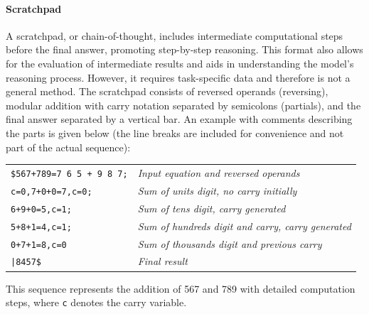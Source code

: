 \paragraph{Scratchpad}\label{par:scratchpad}
A scratchpad, or chain-of-thought, includes intermediate computational steps before the final answer, promoting step-by-step reasoning. This format also allows for the evaluation of intermediate results and aids in understanding the model's reasoning process. However, it requires task-specific data and therefore is not a general method. The scratchpad consists of reversed operands (reversing), modular addition with carry notation separated by semicolons (partials), and the final answer separated by a vertical bar. An example with comments describing the parts is given below (the line breaks are included for convenience and not part of the actual sequence):
\begin{center}
    \begin{tabular}{l l}
        \verb|$567+789=7 6 5 + 9 8 7;| & \textit{Input equation and reversed operands}             \\
        \verb|c=0,7+0+0=7,c=0;|        & \textit{Sum of units digit, no carry initially}           \\
        \verb|6+9+0=5,c=1;|            & \textit{Sum of tens digit, carry generated}               \\
        \verb|5+8+1=4,c=1;|            & \textit{Sum of hundreds digit and carry, carry generated} \\
        \verb|0+7+1=8,c=0|             & \textit{Sum of thousands digit and previous carry}        \\
        \texttt{|8457\$}               & \textit{Final result}
    \end{tabular}
\end{center}

This sequence represents the addition of 567 and 789 with detailed computation steps, where \texttt{c} denotes the carry variable.


